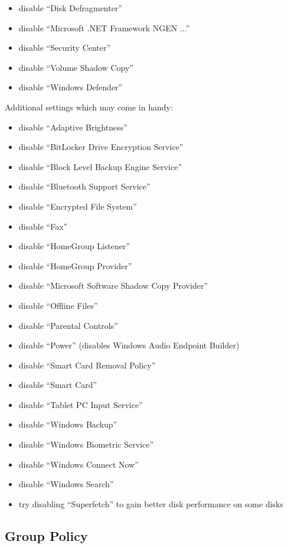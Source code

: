 \documentclass{itsarticle}
\begin{document}
\begin{itemize}
    \item disable ``Disk Defragmenter''
    \item disable ``Microsoft .NET Framework NGEN ...''
    \item disable ``Security Center''
    \item disable ``Volume Shadow Copy''
    \item disable ``Windows Defender''
\end{itemize}

Additional settings which may come in handy:

\begin{itemize}
    \item disable ``Adaptive Brightness''
    \item disable ``BitLocker Drive Encryption Service''
    \item disable ``Block Level Backup Engine Service''
    \item disable ``Bluetooth Support Service''
    \item disable ``Encrypted File System''
    \item disable ``Fax''
    \item disable ``HomeGroup Listener''
    \item disable ``HomeGroup Provider''
    \item disable ``Microsoft Software Shadow Copy Provider''
    \item disable ``Offline Files''
    \item disable ``Parental Controls''
    \item disable ``Power'' (disables Windows Audio Endpoint Builder)
    \item disable ``Smart Card Removal Policy''
    \item disable ``Smart Card''
    \item disable ``Tablet PC Input Service''
    \item disable ``Windows Backup''
    \item disable ``Windows Biometric Service''
    \item disable ``Windows Connect Now''
    \item disable ``Windows Search''
    \item try disabling ``Superfetch'' to gain better disk performance on some
        disks
\end{itemize}

\subsection{Group Policy}
\label{ssub:group_policty}
\end{document}
